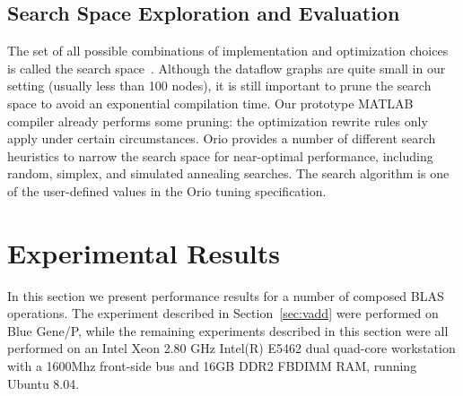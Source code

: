 \documentclass[runningheads]{llncs}
\begin{document}
\subsection{Search Space Exploration and Evaluation}
\label{sec:search}

The set of all possible combinations of implementation and optimization choices is called the search space~\cite{Kisuki:2000uq,Triantafyllis:2003uq,Cooper:2005kx}.  Although the dataflow graphs are quite small in our setting (usually less than 100 nodes), it is still important to prune the search space to avoid an exponential compilation time. Our prototype MATLAB compiler already performs some pruning: the optimization rewrite rules only apply under certain circumstances. 
%
%
Orio provides a number of different search heuristics to narrow the search space for near-optimal performance, including random, simplex, and simulated annealing searches. The search algorithm is one of the user-defined values in the Orio tuning specification.

\section{Experimental Results}
\label{sec:experiments}

In this section we present performance results for a number of composed BLAS operations. The experiment described in Section~\ref{sec:vadd} were performed on Blue Gene/P, while the remaining experiments described in this section were all performed on an Intel Xeon 2.80 GHz Intel(R) E5462 dual quad-core workstation with a 1600Mhz front-side bus and 16GB DDR2 FBDIMM RAM, running Ubuntu 8.04.

\end{document}
